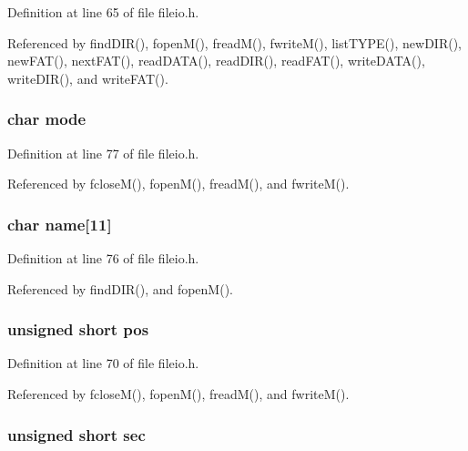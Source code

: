 Definition at line 65 of file fileio.\-h.



Referenced by find\-D\-I\-R(), fopen\-M(), fread\-M(), fwrite\-M(), list\-T\-Y\-P\-E(), new\-D\-I\-R(), new\-F\-A\-T(), next\-F\-A\-T(), read\-D\-A\-T\-A(), read\-D\-I\-R(), read\-F\-A\-T(), write\-D\-A\-T\-A(), write\-D\-I\-R(), and write\-F\-A\-T().

\hypertarget{struct_m_f_i_l_e_a000e34997df38c2005a83d63e67d9282}{
\subsubsection[{mode}]{\setlength{\rightskip}{0pt plus 5cm}char mode}}\label{struct_m_f_i_l_e_a000e34997df38c2005a83d63e67d9282}


Definition at line 77 of file fileio.\-h.



Referenced by fclose\-M(), fopen\-M(), fread\-M(), and fwrite\-M().

\hypertarget{struct_m_f_i_l_e_afb5f90328f746a429516e6c9b1a069e2}{
\subsubsection[{name}]{\setlength{\rightskip}{0pt plus 5cm}char name\mbox{[}11\mbox{]}}}\label{struct_m_f_i_l_e_afb5f90328f746a429516e6c9b1a069e2}


Definition at line 76 of file fileio.\-h.



Referenced by find\-D\-I\-R(), and fopen\-M().

\hypertarget{struct_m_f_i_l_e_a23444e2bb0bb33d50004192d64be2590}{
\subsubsection[{pos}]{\setlength{\rightskip}{0pt plus 5cm}unsigned short pos}}\label{struct_m_f_i_l_e_a23444e2bb0bb33d50004192d64be2590}


Definition at line 70 of file fileio.\-h.



Referenced by fclose\-M(), fopen\-M(), fread\-M(), and fwrite\-M().

\hypertarget{struct_m_f_i_l_e_a2080d32eab8db36848f7e4af7976dd84}{
\subsubsection[{sec}]{\setlength{\rightskip}{0pt plus 5cm}unsigned short sec}}\label{struct_m_f_i_l_e_a2080d32eab8db36848f7e4af7976dd84}


